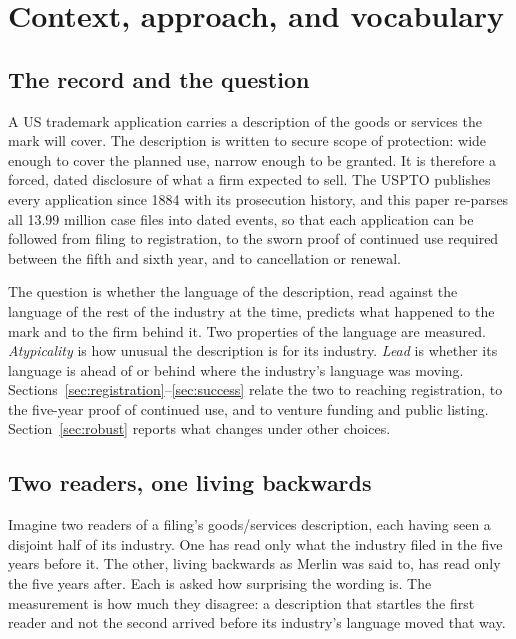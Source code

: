 \section{Context, approach, and vocabulary}\label{sec:construct}

\subsection{The record and the question}

A US trademark application carries a description of the goods or services
the mark will cover. The description is written to secure scope of
protection: wide enough to cover the planned use, narrow enough to be
granted. It is therefore a forced, dated disclosure of what a firm expected
to sell. The USPTO publishes every application since 1884 with its
prosecution history, and this paper re-parses all 13.99 million case files
into dated events, so that each application can be followed from filing to
registration, to the sworn proof of continued use required between the fifth
and sixth year, and to cancellation or renewal.

The question is whether the language of the description, read against the
language of the rest of the industry at the time, predicts what happened to
the mark and to the firm behind it. Two properties of the language are
measured. \emph{Atypicality} is how unusual the description is for its
industry. \emph{Lead} is whether its language is ahead of or behind where the
industry's language was moving. Sections~\ref{sec:registration}--\ref{sec:success}
relate the two to reaching registration, to the five-year proof of continued
use, and to venture funding and public listing. Section~\ref{sec:robust}
reports what changes under other choices.

\subsection{Two readers, one living backwards}

Imagine two readers of a filing's goods/services description, each having seen
a disjoint half of its industry. One has read only what the industry filed in
the five years before it. The other, living backwards as Merlin was said to,
has read only the five years after. Each is asked how surprising the wording
is. The measurement is how much they disagree: a description that startles the
first reader and not the second arrived before its industry's language moved
that way.

